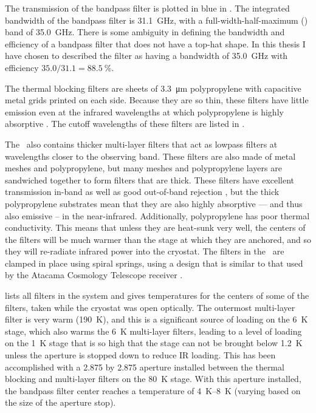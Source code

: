 The transmission of the bandpass filter is plotted in blue in .
The integrated bandwidth of the bandpass filter is \SI{31.1}{\GHz}, with a full-width-half-maximum (\FWHM) band of \SI{35.0}{\GHz}.
There is some ambiguity in defining the bandwidth and efficiency of a bandpass filter that does not have a top-hat shape.
In this thesis I have chosen to described the filter as having a bandwidth of \SI{35.0}{\GHz} with efficiency $35.0 / 31.1 = \SI{88.5}{\percent}$.

The thermal blocking filters are sheets of \SI{3.3}{\um} polypropylene with capacitive metal grids printed on each side.
Because they are so thin, these filters have little emission even at the infrared wavelengths at which polypropylene is highly absorptive \cite{tucker_thermal_2006}.
The cutoff wavelengths of these filters are listed in .

The \Imager\ also contains thicker multi-layer filters that act as lowpass filters at wavelengths closer to the observing band.
These filters are also made of metal meshes and polypropylene, but many meshes and polypropylene layers are sandwiched together to form filters that are  thick.
These filters have excellent transmission in-band as well as good out-of-band rejection \cite{ade_review_2006}, but the thick polypropylene substrates mean that they are also highly absorptive --- and thus also emissive -- in the near-infrared.
Additionally, polypropylene has poor thermal conductivity.
This means that unless they are heat-sunk very well, the centers of the filters will be much warmer than the stage at which they are anchored, and so they will re-radiate infrared power into the cryostat.
The filters in the \Imager\ are clamped in place using spiral springs, using a design that is similar to that used by the Atacama Cosmology Telescope receiver \cite{swetz_overview_2011}.

 lists all filters in the system and gives temperatures for the centers of some of the filters, taken while the cryostat was open optically.
The outermost multi-layer filter is very warm (\SI{190}{\K}), and this is a significant source of loading on the \SI{6}{\K} stage, which also warms the \SI{6}{\K} multi-layer filters, leading to a level of loading on the \SI{1}{\K} stage that is so high that the stage can not be brought below \SI{1.2}{\K} unless the aperture is stopped down to reduce IR loading.
This has been accomplished with a \SI{2.875}{\in} by \SI{2.875}{\in} aperture installed between the thermal blocking and multi-layer filters on the \SI{80}{\K} stage.
With this aperture installed, the bandpass filter center reaches a temperature of \SIrange{4}{8}{\K} (varying based on the size of the aperture stop).

